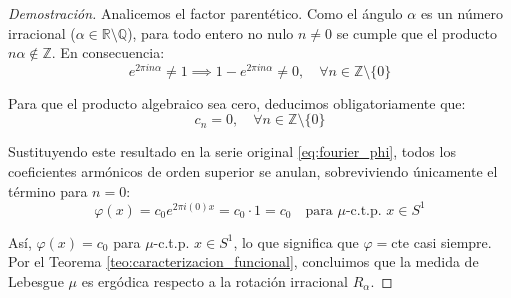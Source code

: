 \begin{proof}[Demostración]
	Analicemos el factor parentético. Como el ángulo $\alpha$ es un número irracional ($\alpha \in \mathbb{R} \setminus \mathbb{Q}$), para todo entero no nulo $n \neq 0$ se cumple que el producto $n\alpha \notin \mathbb{Z}$. En consecuencia:
	$$ e^{2\pi i n \alpha} \neq 1 \implies 1 - e^{2\pi i n \alpha} \neq 0, \quad \forall n \in \mathbb{Z} \setminus \{0\} $$
	
	Para que el producto algebraico sea cero, deducimos obligatoriamente que:
	$$ c_n = 0, \quad \forall n \in \mathbb{Z} \setminus \{0\} $$
	
	Sustituyendo este resultado en la serie original \eqref{eq:fourier_phi}, todos los coeficientes armónicos de orden superior se anulan, sobreviviendo únicamente el término para $n=0$:
	$$ \varphi(x) = c_0 e^{2\pi i (0) x} = c_0 \cdot 1 = c_0 \quad \text{para } \mu\text{-c.t.p. } x \in S^1 $$
	
	Así, $\varphi(x) = c_0$ para $\mu$-c.t.p. $x \in S^1$, lo que significa que $\varphi = \text{cte}$ casi siempre. Por el Teorema \ref{teo:caracterizacion_funcional}, concluimos que la medida de Lebesgue $\mu$ es ergódica respecto a la rotación irracional $R_\alpha$.
\end{proof}




